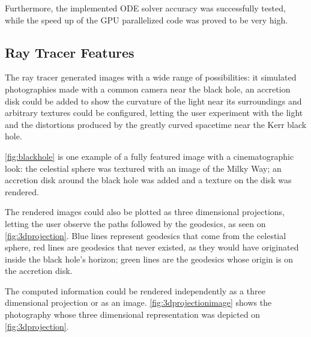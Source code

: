 Furthermore, the implemented \ac{ODE} solver accuracy was successfully tested, while the speed up of the \ac{GPU} parallelized code was proved to be very high.

\subsection{Ray Tracer Features}

The ray tracer generated images with a wide range of possibilities: it simulated photographies made with a common camera near the black hole, an accretion disk could be added to show the curvature of the light near its surroundings and arbitrary textures could be configured, letting the user experiment with the light and the distortions produced by the greatly curved spacetime near the Kerr black hole.

\autoref{fig:blackhole} is one example of a fully featured image with a cinematographic look: the celestial sphere was textured with an image of the Milky Way; an accretion disk around the black hole was added and a texture on the disk was rendered.

The rendered images could also be plotted as three dimensional projections, letting the user observe the paths followed by the geodesics, as seen on \autoref{fig:3dprojection}. Blue lines represent geodesics that come from the celestial sphere, red lines are geodesics that never existed, as they would have originated inside the black hole's horizon; green lines are the geodesics whose origin is on the accretion disk.

The computed information could be rendered independently as a three dimensional projection or as an image. \autoref{fig:3dprojectionimage} shows the photography whose three dimensional representation was depicted on \autoref{fig:3dprojection}.

